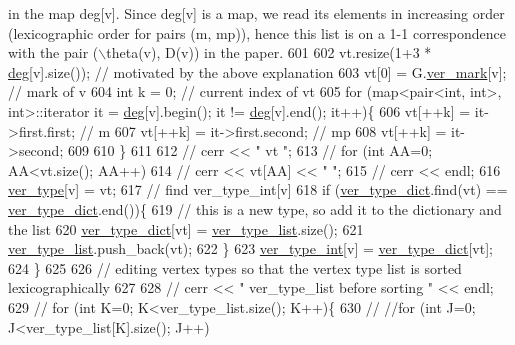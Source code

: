 \begin{DoxyCode}
{       in the map deg[v]. Since deg[v] is a map, we read its elements in increasing order (lexicographic order for
       pairs (m, mp)), hence this list is on a 1-1 correspondence with the pair (\(\backslash\)theta(v), D(v)) in the paper.}
601     
602     vt.resize(1+3 * \hyperlink{classcolored__graph_ae3269d35c1b022bc70d195bebd4e1b8a}{deg}[v].size()); \textcolor{comment}{// motivated by the above explanation}
603     vt[0] = G.\hyperlink{classmarked__graph_ac83e9377dd4d8bb95be1ac949b127296}{ver\_mark}[v]; \textcolor{comment}{// mark of v}
604     \textcolor{keywordtype}{int} k = 0; \textcolor{comment}{// current index of vt}
605     \textcolor{keywordflow}{for} (map<pair<int, int>, \textcolor{keywordtype}{int}>::iterator it = \hyperlink{classcolored__graph_ae3269d35c1b022bc70d195bebd4e1b8a}{deg}[v].begin(); it != \hyperlink{classcolored__graph_ae3269d35c1b022bc70d195bebd4e1b8a}{deg}[v].end(); it++)\{
606       vt[++k] = it->first.first; \textcolor{comment}{// m}
607       vt[++k] = it->first.second; \textcolor{comment}{// mp}
608       vt[++k] = it->second;
609       
610     \}
611 
612     \textcolor{comment}{// cerr << " vt ";}
613     \textcolor{comment}{// for (int AA=0; AA<vt.size(); AA++)}
614     \textcolor{comment}{//   cerr << vt[AA] << " ";}
615     \textcolor{comment}{// cerr << endl;}
616     \hyperlink{classcolored__graph_a2cc32e7146fa3319f83cfa940f5e1be4}{ver\_type}[v] = vt;
617     \textcolor{comment}{// find ver\_type\_int[v]}
618     \textcolor{keywordflow}{if} (\hyperlink{classcolored__graph_aeb780762429ddac375799f4a45405712}{ver\_type\_dict}.find(vt) == \hyperlink{classcolored__graph_aeb780762429ddac375799f4a45405712}{ver\_type\_dict}.end())\{
619       \textcolor{comment}{// this is a new type, so add it to the dictionary and the list }
620       \hyperlink{classcolored__graph_aeb780762429ddac375799f4a45405712}{ver\_type\_dict}[vt] = \hyperlink{classcolored__graph_a3a1ae8abac458d20a2afb4aa48bbc956}{ver\_type\_list}.size();
621       \hyperlink{classcolored__graph_a3a1ae8abac458d20a2afb4aa48bbc956}{ver\_type\_list}.push\_back(vt);
622     \}
623     \hyperlink{classcolored__graph_a491ed2ea1a65118af02ec606c8d44c0a}{ver\_type\_int}[v] = \hyperlink{classcolored__graph_aeb780762429ddac375799f4a45405712}{ver\_type\_dict}[vt];
624   \}
625 
626   \textcolor{comment}{// editing vertex types so that the vertex type list is sorted lexicographically}
627 
628   \textcolor{comment}{// cerr << " ver\_type\_list before sorting " << endl;}
629   \textcolor{comment}{// for (int K=0; K<ver\_type\_list.size(); K++)\{}
630   \textcolor{comment}{//   //for (int J=0; J<ver\_type\_list[K].size(); J++)}

\end{DoxyCode}

